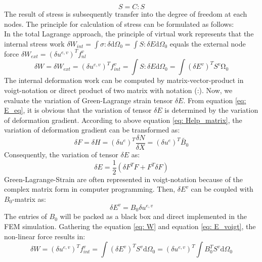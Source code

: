 \begin{equation}
S = C : S
\end{equation}
The result of stress is subsequently transfer into the degree of freedom at each nodes. The principle for calculation of stress can be formulated as follows:\\
In the total Lagrange approach, the principle of virtual work represents that the internal stress work $\delta W_{int} = \int \sigma : \delta \mathrm{d}\Omega_0 = \int S : \delta E \mathrm{d}\Omega_0$ equals the external node force $\delta W_{ext} = \left(\delta u^{e,v}\right)^T f_{nl}^v$
\begin{equation} \label{eq: W}
\delta W = \delta W_{ext} = \left(\delta u^{e,v}\right)^T f_{int}^v = \int S : \delta E \mathrm{d}\Omega_0 = \int \left( \delta E^v\right)^T S^v \mathrm{\Omega_0}
\end{equation}
The internal deformation work can be computed by matrix-vector-product in voigt-notation or direct product of two matrix with notation (:). Now, we evaluate the variation of Green-Lagrange strain tensor $\delta E$. From equation \ref{eq: E_eq}, it is obvious that the variation of tensor $\delta E$ is determined by the variation of deformation gradient. According to above equation \ref{eq: Help_matrix}, the variation of deformation gradient can be transformed as:
\begin{equation}
\delta F = \delta H = \left(\delta u^e\right)^T \frac{\delta N}{\delta X} = \left(\delta u^e\right)^T \tilde{B_0}
\end{equation}
Consequently, the variation of tensor $\delta E$ as:
\begin{equation}
\delta E = \frac{1}{2} \left(\delta F^T F + F^T \delta F \right)
\end{equation}
Green-Lagrange-Strain are often represented in voigt-notation because of the complex matrix form in computer programming. Then, $\delta E^v$ can be coupled with $B_0$-matrix as:
\begin{equation} \label{eq: E_voigt}
\delta E^v = B_0 \delta u^{e,v}
\end{equation} 
The entries of $B_0$ will be packed as a black box and direct implemented in the FEM simulation. Gathering the equation \ref{eq: W} and equation \ref{eq: E_voigt}, the non-linear force results in:
\begin{equation}
\delta W = \left(\delta u^{e,v}\right)^T f_{int}^v = \int \left(\delta E^v\right)^T S^v \mathrm{d}\Omega_0 = \left( \delta u^{e,v}\right)^T \int B_0^T S^v \mathrm{d}\Omega_0
\end{equation}
